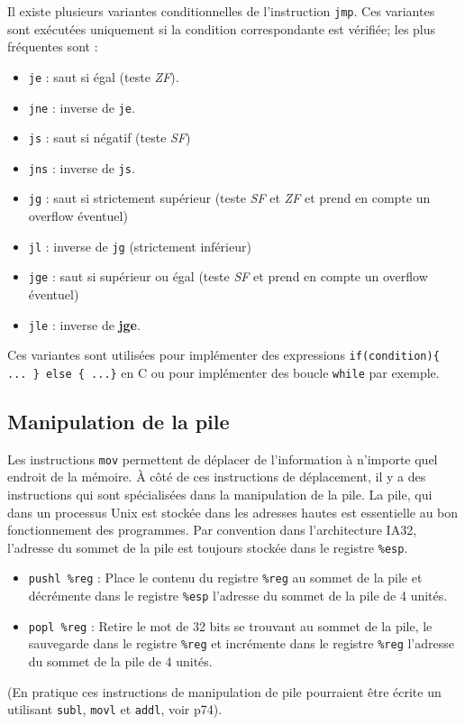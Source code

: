 Il existe plusieurs variantes conditionnelles de l'instruction \texttt{jmp}.
Ces variantes sont exécutées uniquement si la condition correspondante est vérifiée; les plus fréquentes sont :
\begin{itemize}
  \item \texttt{je} : saut si égal (teste \textit{ZF}).
  \item \texttt{jne} : inverse de \texttt{je}.
  \item \texttt{js} : saut si négatif (teste \textit{SF})
  \item \texttt{jns} : inverse de \texttt{js}.
  \item \texttt{jg} : saut si strictement supérieur (teste \textit{SF} et \textit{ZF} et prend en compte un overflow éventuel)
  \item \texttt{jl} : inverse de \texttt{jg} (strictement inférieur)
  \item \texttt{jge} : saut si supérieur ou égal (teste \textit{SF} et prend en compte un overflow éventuel)
  \item \texttt{jle} : inverse de \textbf{jge}.
\end{itemize}
Ces variantes sont utilisées pour implémenter des expressions \texttt{if(condition)\{ ...
\} else \{ ...\}} en C ou pour implémenter des boucle \texttt{while} par exemple.

\subsection{Manipulation de la pile}
\label{manip_de_la_pile}
Les instructions \texttt{mov} permettent de déplacer de l'information à n'importe quel endroit de la mémoire.
À côté de ces instructions de déplacement, il y a des instructions qui sont spécialisées dans la manipulation de la pile.
La pile, qui dans un processus Unix est stockée dans les adresses hautes est essentielle au bon fonctionnement des programmes.
Par convention dans l'architecture IA32, l'adresse du sommet de la pile est toujours stockée dans le registre \texttt{\%esp}.

\begin{itemize}
  \item \texttt{pushl \%reg} : Place le contenu du registre \texttt{\%reg} au sommet de la pile et décrémente dans le registre \texttt{\%esp} l'adresse du sommet de la pile de 4 unités.
  \item \texttt{popl \%reg} : Retire le mot de 32 bits se trouvant au sommet de la pile, le sauvegarde dans le registre \texttt{\%reg} et incrémente dans le registre \texttt{\%reg} l'adresse du sommet de la pile de 4 unités.
\end{itemize}
(En pratique ces instructions de manipulation de pile pourraient être écrite un utilisant \texttt{subl}, \texttt{movl} et \texttt{addl}, voir p74).

